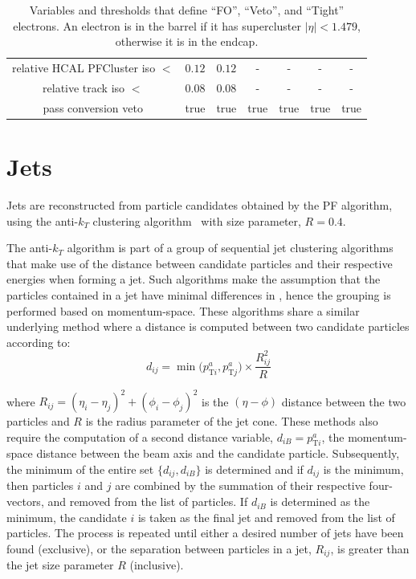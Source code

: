 \begin{table}[!ht]
\begin{tabular}{|c|c|c|c|c|c|c|}
  relative HCAL PFCluster iso $<$               & $0.12$    & $0.12$   & -         & -         & -         & - \\
  relative track iso $<$                        & $0.08$    & $0.08$    & -         & -         & -         & - \\
  pass conversion veto                          & true      & true     & true      & true      & true      & true     \\
\hline
\end{tabular}
\caption{Variables and thresholds that define ``FO'', ``Veto'', and ``Tight'' electrons. An electron is in the barrel if it has supercluster $|\eta|<1.479$, otherwise it is in the endcap.}
\label{tab:ele_wp}
\end{table}
\section{Jets}
\label{sec:jets}
Jets are reconstructed from particle candidates obtained by the PF algorithm, using the anti-$k_{T}$ clustering algorithm~\cite{Cacciari:2008gp} with size parameter, $R=0.4$.

The anti-$k_{T}$ algorithm is part of a group of sequential jet clustering algorithms that make use of the distance between candidate particles and their respective energies when forming a jet. Such algorithms make the assumption that the particles contained in a jet have minimal differences in \pt, hence the grouping is performed based on momentum-space. These algorithms share a similar underlying method where a distance is computed between two candidate particles according to:
\begin{equation}
  d_{ij} = \min\bigg(p_{\text{T}i}^{a},p_{\text{T}j}^{a}\bigg)\times\frac{R_{ij}^{2}}{R}
  \label{eq:seqclus}
\end{equation}

where $R_{ij} = (\eta_{i}-\eta_{j})^{2} + (\phi_{i}-\phi_{j})^{2}$ is the $(\eta-\phi)$ distance between the two particles and $R$ is the radius parameter of the jet cone. These methods also require the computation of a second distance variable, $d_{iB}=p_{\text{T}i}^{a}$, the momentum-space distance between the beam axis and the candidate particle. Subsequently, the minimum of the entire set $\{d_{ij},d_{iB}\}$ is determined and if $d_{ij}$ is the minimum, then particles $i$ and $j$ are combined by the summation of their respective four-vectors, and removed from the list of particles. If $d_{iB}$ is determined as the minimum, the candidate $i$ is taken as the final jet and removed from the list of particles. The process is repeated until either a desired number of jets have been found (exclusive), or the separation between particles in a jet, $R_{ij}$, is greater than the jet size parameter $R$ (inclusive).

